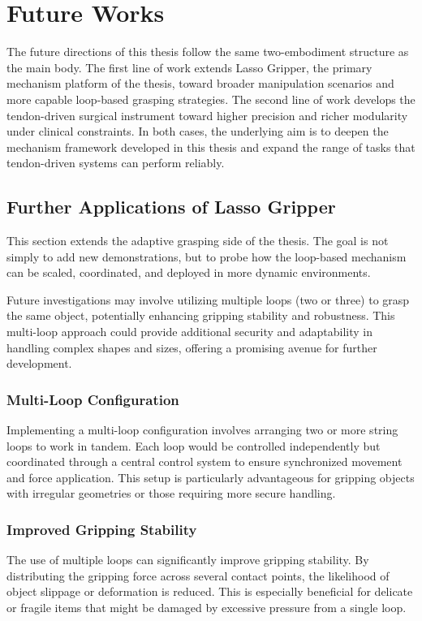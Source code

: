 \chapter{Future Works} %

\label{Chapter10} %
The future directions of this thesis follow the same two-embodiment structure as the main body. The first line of work extends Lasso Gripper, the primary mechanism platform of the thesis, toward broader manipulation scenarios and more capable loop-based grasping strategies. The second line of work develops the tendon-driven surgical instrument toward higher precision and richer modularity under clinical constraints. In both cases, the underlying aim is to deepen the mechanism framework developed in this thesis and expand the range of tasks that tendon-driven systems can perform reliably.

\section{Further Applications of Lasso Gripper}
This section extends the adaptive grasping side of the thesis. The goal is not simply to add new demonstrations, but to probe how the loop-based mechanism can be scaled, coordinated, and deployed in more dynamic environments.

Future investigations may involve utilizing multiple loops (two or three) to grasp the same object, potentially enhancing gripping stability and robustness. This multi-loop approach could provide additional security and adaptability in handling complex shapes and sizes, offering a promising avenue for further development.
\subsection{Multi-Loop Configuration}
Implementing a multi-loop configuration involves arranging two or more string loops to work in tandem. Each loop would be controlled independently but coordinated through a central control system to ensure synchronized movement and force application. This setup is particularly advantageous for gripping objects with irregular geometries or those requiring more secure handling.
\subsection{Improved Gripping Stability}
The use of multiple loops can significantly improve gripping stability. By distributing the gripping force across several contact points, the likelihood of object slippage or deformation is reduced. This is especially beneficial for delicate or fragile items that might be damaged by excessive pressure from a single loop.

